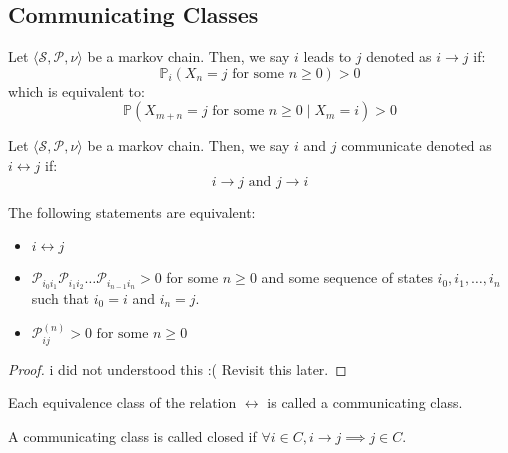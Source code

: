 \subsection{Communicating Classes}
\begin{definition}
    Let \(\langle \mathcal{S} , \mathcal{P} , \nu \rangle\) be a markov chain. Then, we say \(i\) leads to 
    \(j\) denoted as \(i \to j\) if:
    \[
        \mathbb{P}_i ( X_n = j \text{ for some } n \geq 0) > 0
    \] 
    which is equivalent to:
    \[
        \mathbb{P}( X_{m+n} = j \text{ for some } n \geq 0 \mid X_m = i) > 0
    \]
\end{definition}
\begin{definition}
    Let \(\langle \mathcal{S} , \mathcal{P} , \nu \rangle\) be a markov chain. Then, we say \(i\) and \(j\) communicate
    denoted as \(i \leftrightarrow j\) if:
    \[
        i \to j \text{ and } j \to i
    \]
\end{definition}
\begin{theorem}
    The following statements are equivalent:
    \begin{itemize}
        \item \(i \leftrightarrow j\)
        \item \(\mathcal{P}_{i_0 i_1} \mathcal{P}_{i_1 i_2} \dots \mathcal{P}_{i_{n-1} i_n} > 0 \)
        for some \(n \geq  0\)  and some sequence of states \(i_0, i_1, \dots , i_n\)
         such that \(i_0 = i\) and \(i_n = j\).
         \item \(\mathcal{P}_{ij}^{(n)} > 0 \text{ for some } n \geq 0\)
    \end{itemize}
\end{theorem}
\begin{proof}
    i did not understood this :( Revisit this later.
\end{proof}
\begin{definition}
    Each equivalence class of the relation \(\leftrightarrow\) is called a communicating class.

    A communicating class is called closed if \(\forall i \in C, i \to j \implies j \in C\).
\end{definition} 

